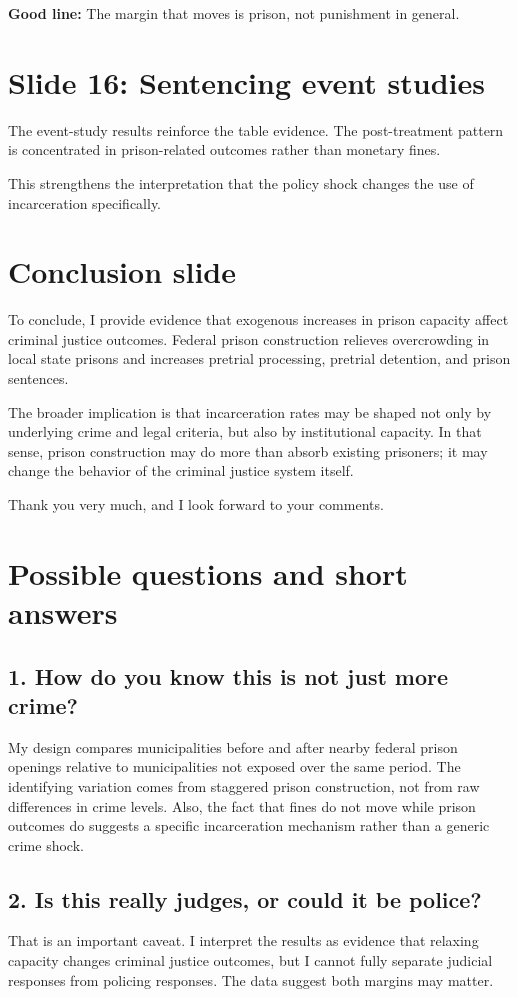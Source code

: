 \documentclass[11pt]{article}
\begin{document}
\textbf{Good line:}
The margin that moves is prison, not punishment in general.

\section{Slide 16: Sentencing event studies}
The event-study results reinforce the table evidence. The post-treatment pattern is concentrated in prison-related outcomes rather than monetary fines.

This strengthens the interpretation that the policy shock changes the use of incarceration specifically.

\section{Conclusion slide}
To conclude, I provide evidence that exogenous increases in prison capacity affect criminal justice outcomes. Federal prison construction relieves overcrowding in local state prisons and increases pretrial processing, pretrial detention, and prison sentences.

The broader implication is that incarceration rates may be shaped not only by underlying crime and legal criteria, but also by institutional capacity. In that sense, prison construction may do more than absorb existing prisoners; it may change the behavior of the criminal justice system itself.

Thank you very much, and I look forward to your comments.

\section{Possible questions and short answers}
\subsection*{1. How do you know this is not just more crime?}
My design compares municipalities before and after nearby federal prison openings relative to municipalities not exposed over the same period. The identifying variation comes from staggered prison construction, not from raw differences in crime levels. Also, the fact that fines do not move while prison outcomes do suggests a specific incarceration mechanism rather than a generic crime shock.

\subsection*{2. Is this really judges, or could it be police?}
That is an important caveat. I interpret the results as evidence that relaxing capacity changes criminal justice outcomes, but I cannot fully separate judicial responses from policing responses. The data suggest both margins may matter.
\end{document}
